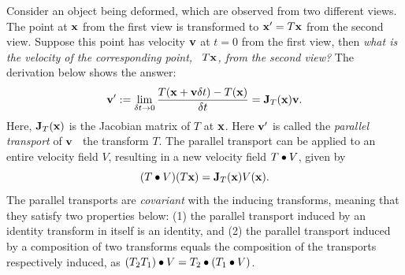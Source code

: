 Consider an object being deformed, which are observed from two
different views. The point at ${\mathbf{x}}$ from the first view is transformed
to ${\mathbf{x}}' = T {\mathbf{x}}$ from the second view. 
Suppose this point has velocity ${\mathbf{v}}$ at $t = 0$ from the
first view, then \emph{what is the velocity of the corresponding
  point, \ie~$T {\mathbf{x}}$, from the second view?}
The derivation below shows the answer:
\begin{equation}
    {\mathbf{v}}' :=
    \lim_{\delta t \rightarrow 0} \frac{T({\mathbf{x}} + {\mathbf{v}} \delta t) -
      T({\mathbf{x}})}{\delta t}
    = {\mathbf{J}}_T({\mathbf{x}}) {\mathbf{v}}.
\end{equation}
Here, ${\mathbf{J}}_T({\mathbf{x}})$ is the Jacobian matrix of $T$ at ${\mathbf{x}}$. Here ${\mathbf{v}}'$
is called the \emph{parallel transport} of ${\mathbf{v}}$ \wrt~the transform
$T$. The parallel transport can be applied to an entire velocity field
$V$, resulting in a new velocity field $T \bullet V$, given by
\begin{equation}
    (T \bullet V)(T {\mathbf{x}}) =
    {\mathbf{J}}_T({\mathbf{x}}) V({\mathbf{x}}).
\end{equation}
The parallel transports are \emph{covariant} with the inducing
transforms, meaning that they satisfy two properties below:
(1) the parallel transport induced by an identity transform in itself
is an identity, and
(2) the parallel transport induced by a composition of two transforms
equals the composition of the transports respectively induced, as
$(T_2 T_1) \bullet V = T_2 \bullet (T_1 \bullet V)$.




